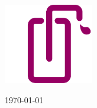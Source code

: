 \makeatletter
\begin{titlepage}
  \begin{center}
    \vspace*{\fill}
    \vspace{2cm}

    \textbf{\Huge\thetitle}
    
    \vspace{1cm}

    {\Large\theauthor}

    \vspace{5cm}

    \includegraphics[height=3.5cm]{img/logo}

    \vspace{1cm}

    \today
    \vspace*{\fill}
  \end{center}
\end{titlepage}
\makeatother